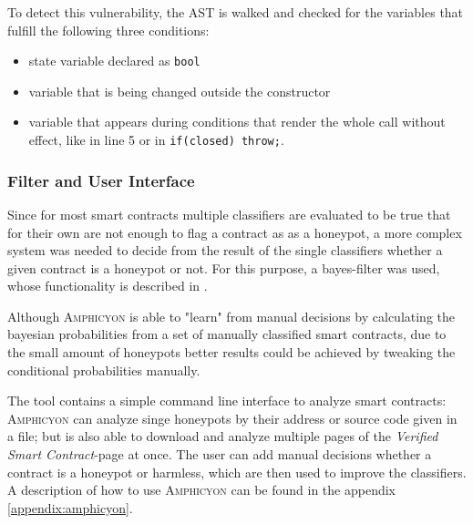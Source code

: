 To detect this vulnerability, the AST is walked and checked for the variables that fulfill the following three conditions:
\begin{itemize}
	\item state variable declared as \texttt{bool}
	\item variable that is being changed outside the constructor
	\item variable that appears during conditions that render the whole call without effect, like in line 5 or in \texttt{if(closed) throw;}.
\end{itemize}

\subsubsection{Filter and User Interface}
Since for most smart contracts multiple classifiers are evaluated to be true that for their own are not enough to flag a contract as as a honeypot, a more complex system was needed to decide from the result of the single classifiers whether a given contract is a honeypot or not. For this purpose, a bayes-filter was used, whose functionality is described in \cite{ct:spamfilter}.

Although \textsc{Amphicyon} is able to "learn" from manual decisions by calculating the bayesian probabilities from a set of manually classified smart contracts, due to the small amount of honeypots better results could be achieved by tweaking the conditional probabilities manually.

The tool contains a simple command line interface to analyze smart contracts: \textsc{Amphicyon} can analyze singe honeypots by their address or source code given in a file; but is also able to download and analyze multiple pages of the \textit{Verified Smart Contract}-page at once. The user can add manual decisions whether a contract is a honeypot or harmless, which are then used to improve the classifiers. A description of how to use \textsc{Amphicyon} can be found in the appendix \ref{appendix:amphicyon}.

